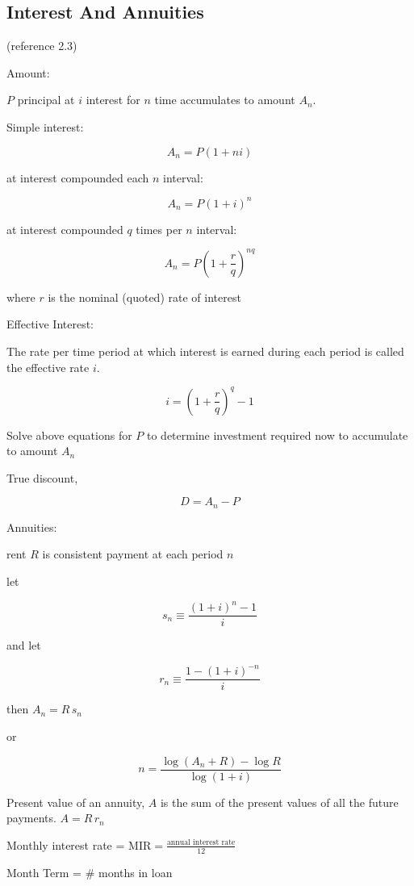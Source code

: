 \documentclass[
]{book}
\begin{document}
\hypertarget{interest-and-annuities}{%
\subsection{Interest And Annuities}\label{interest-and-annuities}}

(reference 2.3)

Amount:

\(P\) principal at \(i\) interest for \(n\) time accumulates to amount \(A_{n}\).

Simple interest:

\[A_{n} = P(1 + ni)\]

at interest compounded each \(n\) interval:

\[A_{n} = P(1 + i)^n \]

at interest compounded \(q\) times per \(n\) interval:

\[A_{n} = P(1 + \frac{r}{q})^{nq} \]

where \(r\) is the nominal (quoted) rate of interest

Effective Interest:

The rate per time period at which interest is earned during each period is called the effective rate \(i\).

\[i = \left( 1 + \frac{r}{q} \right)^q -1\]

Solve above equations for \(P\) to determine investment required now to accumulate to amount \(A_{n}\)

True discount,

\[D = A_{n} - P\]

Annuities:

rent \(R\) is consistent payment at each period \(n\)

let

\[s_n \equiv \frac{\left( 1 + i \right)^n - 1}{i}\]

and let

\[r_n \equiv \frac{1 - \left( 1 + i \right)^{-n}}{i} \]

then \(A_n = R\,s_{n}\)

or

\[n = \frac{\log \left( A_n + R \right) - \log R }{\log \left(1 + i \right)} \]

Present value of an annuity, \(A\) is the sum of the present values of all the future payments. \(A = R\,r_{n}\)

Monthly interest rate = \(\mathrm{MIR} = \frac{ \text{annual interest rate} }{12}\)

Month Term = \# months in loan
\end{document}
